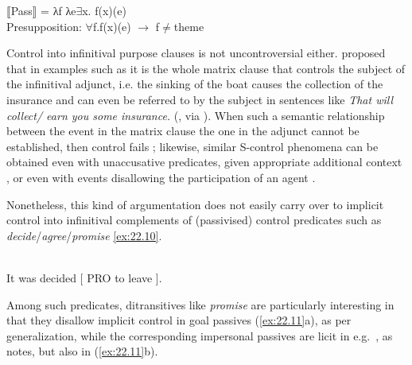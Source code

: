 \documentclass[output=paper]{langsci/langscibook}
\begin{document}
\ea\label{ex:22.6}
    ⟦Pass⟧ = λf λe${\exists}$x. f(x)(e)\\
    Presupposition: ${\forall}$f.f(x)(e) $\to$ f${\neq}$theme
\z

Control into infinitival purpose clauses is not uncontroversial either.
\citet{Williams1985} proposed that in examples such as  it is
the whole matrix clause that controls the subject of the infinitival adjunct,
i.e.  the sinking of the boat causes the collection of the insurance and can
even be referred to by the subject in sentences like \emph{That will collect\slash 
earn you some insurance.} (\citealt{Williams1985}, via
\citealt[573]{BhattPancheva2006}). When such a semantic relationship between
the event in the matrix clause the one in the adjunct cannot be established,
then control fails ; likewise, similar S-control phenomena can
be obtained even with unaccusative predicates, given
appropriate additional context , or even with events
disallowing the participation of an agent .

\label{ex:22.7}
\z

Nonetheless, this kind of argumentation does not easily carry over to implicit
control into infinitival complements of (passivised) control predicates such as
\emph{decide}/\emph{agree}/\emph{promise} \eqref{ex:22.10}.

\ea\label{ex:22.10} \textcite[4]{Landau2010}\\
    It was decided [ PRO to leave ].
\z

Among such predicates, ditransitives like \emph{promise} are particularly
interesting in that they disallow implicit control in goal passives
(\ref{ex:22.11}a), as per  generalization, while the
corresponding impersonal passives are licit in e.g.\ , as
\citet{vanUrk2013} notes, but also in 
(\ref{ex:22.11}b).\largerpage

\ea\label{ex:22.11} \textcite{PitteroffSchafer2017}
    \z
\z
\end{document}
